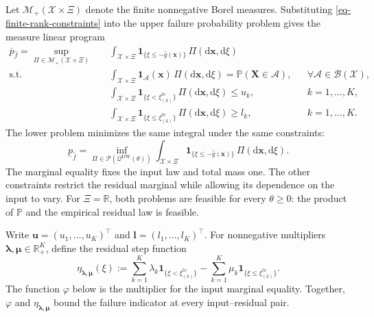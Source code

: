 \documentclass[review,11pt,3p,authoryear,nopreprintline]{elsarticle}
\begin{document}
Let $\mathcal M_+(\mathcal X\times\Xi)$ denote the finite nonnegative Borel measures. Substituting \eqref{eq-finite-rank-constraints} into the upper failure probability problem gives the measure linear program
\begin{equation}
  \begin{aligned}
    \overline p_{\hat f}
    =\sup_{\Pi\in\mathcal M_+(\mathcal X\times\Xi)}\quad&
      \int_{\mathcal X\times\Xi}
      \mathbf1_{\{\xi\le -\hat g(\bm x)\}}\,\Pi(\mathrm d\bm x,\mathrm d\xi)\\
    \text{s.t.}\quad&
      \int_{\mathcal X\times\Xi}
      \mathbf1_\mathcal{A}(\bm x)\,\Pi(\mathrm d\bm x,\mathrm d\xi)
      =\mathbb P(\bm{X} \in \mathcal{A}),
      &&\forall \mathcal{A}\in\mathcal B(\mathcal X),\\
    &\int_{\mathcal X\times\Xi}
      \mathbf1_{\{\xi<\xi_{(k)}^{\mathrm{te}}\}}\,\Pi(\mathrm d\bm x,\mathrm d\xi)\le u_k,
      &&k=1,\ldots,K,\\
    &\int_{\mathcal X\times\Xi}
      \mathbf1_{\{\xi\le \xi_{(k)}^{\mathrm{te}}\}}\,\Pi(\mathrm d\bm x,\mathrm d\xi)\ge l_k,
      &&k=1,\ldots,K.
  \end{aligned}
  \label{eq-measure-upper}
\end{equation}
The lower problem minimizes the same integral under the same constraints:
\begin{equation}
  \underline p_{\hat f}
  =\inf_{\Pi\in\mathscr P(\mathscr Q^{\mathrm{DW}}(\theta))}
    \int_{\mathcal X\times\Xi}
    \mathbf1_{\{\xi\le -\hat g(\bm x)\}}\,\Pi(\mathrm d\bm x,\mathrm d\xi).
  \label{eq-measure-lower}
\end{equation}
The marginal equality fixes the input law and total mass one. The other constraints restrict the residual marginal while allowing its dependence on the input to vary. For $\Xi=\mathbb R$, both problems are feasible for every $\theta\ge0$: the product of $\mathbb P$ and the empirical residual law is feasible.

Write $\bm u=(u_1,\ldots,u_K)^\top$ and $\bm l=(l_1,\ldots,l_K)^\top$. For nonnegative multipliers $\bm\lambda,\bm\mu\in\mathbb R_+^K$, define the residual step function
\begin{equation}
  \eta_{\bm\lambda,\bm\mu}(\xi)
  :=\sum_{k=1}^K\lambda_k\mathbf1_{\{\xi<\xi_{(k)}^{\mathrm{te}}\}}
    -\sum_{k=1}^K\mu_k\mathbf1_{\{\xi\le \xi_{(k)}^{\mathrm{te}}\}}.
  \label{eq-dual-step-function}
\end{equation}
The function $\varphi$ below is the multiplier for the input marginal equality. Together, $\varphi$ and $\eta_{\bm\lambda,\bm\mu}$ bound the failure indicator at every input--residual pair.
\end{document}
